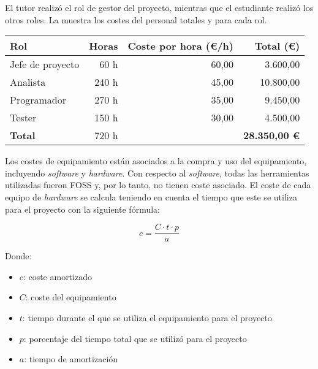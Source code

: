 El tutor realizó el rol de gestor del proyecto, mientras que el estudiante
realizó los otros roles. La  muestra los costes del
personal totales y para cada rol.

\begin{table}[htb]
    {
      \begin{tabular}{lrrr}
        \toprule
        \textbf{Rol} & \textbf{Horas} & \textbf{Coste por hora (\euro/h)} & \textbf{Total (\euro)} \\
        \midrule
        Jefe de proyecto &  60 h & 60,00 &  3.600,00 \\
        Analista         & 240 h & 45,00 & 10.800,00 \\
        Programador      & 270 h & 35,00 &  9.450,00 \\
        Tester           & 150 h & 30,00 &  4.500,00 \\
        \midrule
        \textbf{Total}   & 720 h &       & \textbf{28.350,00 \euro} \\
        \bottomrule
      \end{tabular}
    }
\end{table}

Los costes de equipamiento están asociados a la compra y uso del equipamiento,
incluyendo \textit{software} y \textit{hardware}. Con respecto al
\textit{software}, todas las herramientas utilizadas fueron \gls{FOSS} y, por lo
tanto, no tienen coste asociado. El coste de cada equipo de \textit{hardware}
se calcula teniendo en cuenta el tiempo que este se utiliza para el proyecto con
la siguiente fórmula:

\begin{equation}\label{eq:chargeable-cost}
    c = \frac{C \cdot t \cdot p}{a}
\end{equation}

\noindent
Donde:

\begin{itemize}
    \item $c$: coste amortizado
    \item $C$: coste del equipamiento
    \item $t$: tiempo durante el que se utiliza el equipamiento para el proyecto
    \item $p$: porcentaje del tiempo total que se utilizó para el proyecto
    \item $a$: tiempo de amortización
\end{itemize}

